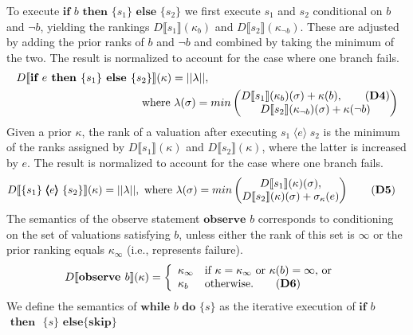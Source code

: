 \documentclass{llncs}
\newcommand{\dn}[1]{D\llbracket #1 \rrbracket}
\newcommand{\Rank}[1]{\hspace{3pt} \pmb{\langle} #1 \pmb{\rangle}\hspace{3pt} } %
\begin{document}
To execute $\textbf{if }b\textbf{ then }\{ s_1 \}\textbf{ else }\{ s_2 \}$ we first 
	execute $s_1$ and $s_2$ conditional on $b$ and $\neg b$,
		yielding the rankings $\dn{s_1}(\kappa_{b})$ and $\dn{s_2}(\kappa_{\neg b})$.
	These are adjusted by adding the prior ranks of $b$ and $\neg b$ and
		combined by taking the minimum of the two.
	The result is normalized to account for the case where one branch fails.
\begin{align*}
\dn{\textbf{if }e\textbf{ then }\{ s_1 \}\textbf{ else }\{ s_2 \}}(\kappa)	& = || \lambda ||,   \\
			&  \hspace{-30pt} \mbox{ where }\lambda(\sigma) = min\begin{pmatrix} \dn{s_1}(\kappa_{b})(\sigma) + \kappa(b), \tag{\textbf{D4}} \\ \dn{s_2}(\kappa_{\neg b})(\sigma) + \kappa(\neg b) \end{pmatrix}  
\end{align*}
	Given a prior $\kappa$, the rank of a valuation after executing $s_1 \Rank{e} s_2$
		is the minimum of the ranks assigned by $\dn{s_1}(\kappa)$ and $\dn{s_2}(\kappa)$,
			where the latter is increased by $e$.
	The result is normalized to account for the case where one branch fails.
\begin{align}
\dn{\{ s_1 \} \Rank{e} \{ s_2 \}}(\kappa)	& = || \lambda ||, \mbox{ where }\lambda(\sigma) = min \begin{pmatrix} \dn{s_1}(\kappa)(\sigma), \\ \dn{s_2}(\kappa)(\sigma) + \sigma_{\kappa}(e) \end{pmatrix} \tag{\textbf{D5}} 
\end{align}
	The semantics of the observe statement $\textbf{observe }b$ corresponds to conditioning on the set of valuations satisfying $b$, unless either the rank of this set is $\infty$ or the prior ranking equals $\kappa_{\infty}$ (i.e., represents failure).
\begin{align}
\dn{\textbf{observe }b}(\kappa)  & = 
		\left\{
			\begin{array}{ll}
				\kappa_{\infty}								& \mbox{if }\kappa = \kappa_\infty\mbox{ or }\kappa(b) = \infty\mbox{, or}\\
				\kappa_{b}								& \mbox{otherwise.}\tag{\textbf{D6}}
			\end{array}
		\right. 
\end{align}
	We define the semantics of $\textbf{while }b\textbf{ do }\{s\}$
		as the iterative execution of $\textbf{if }b$ $\textbf{ then }$ $\{s\}$ $\textbf{else} \{\textbf{skip}\}$
\end{document}
